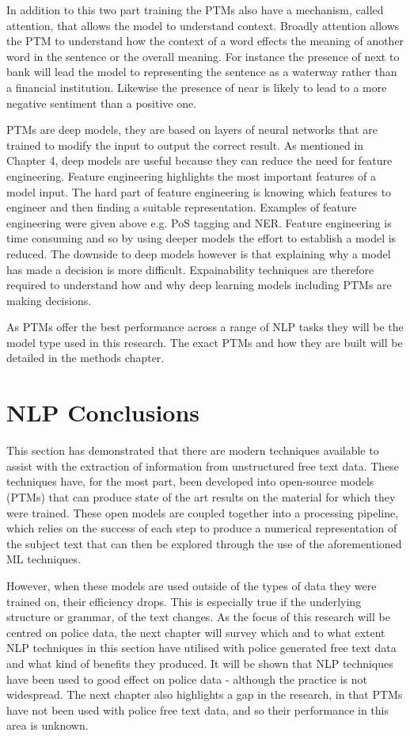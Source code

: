 In addition to this two part training the PTMs also have a mechanism, called attention, that allows the model to understand context. Broadly attention allows the PTM to understand how the context of a word effects the meaning of another word in the sentence or the overall meaning. For instance the presence of  next to {bank} will lead the model to representing the sentence as a waterway rather than a financial institution. Likewise the presence of  near  is likely to lead to a more negative sentiment than a positive one.

PTMs are deep models, they are based on layers of neural networks that are trained to modify the input to output the correct result. As mentioned in Chapter 4, deep models are useful because they can reduce the need for feature engineering. Feature engineering highlights the most important features of a model input. The hard part of feature engineering is knowing which features to engineer and then finding a suitable representation. Examples of feature engineering were given above e.g. PoS tagging and NER.   Feature engineering is time consuming and so by using deeper models the effort to establish a model is reduced. The downside to deep models however is that explaining why a model has made a decision is more difficult. Expainability techniques are therefore required to understand how and why deep learning models including PTMs are making decisions.

As PTMs offer the best performance across a range of NLP tasks they will be the model type used in this research. The exact PTMs and how they are built will be detailed in the methods chapter. 

\section{ NLP Conclusions} This section has demonstrated that there are modern techniques available to assist with the extraction of information from unstructured free text data. These techniques have, for the most part, been developed into open-source models (PTMs) that can produce state of the art results on the material for which they were trained. These open models are coupled together into a processing pipeline, which relies on the success of each step to produce a numerical representation of the subject text that can then be explored through the use of the aforementioned ML techniques.

However, when these models are used outside of the types of data they were trained on, their efficiency drops. This is especially true if the underlying structure or grammar, of the text changes. As the focus of this research will be centred on police data, the next chapter will survey which and to what extent NLP techniques in this section have utilised with police generated free text data and what kind of benefits they produced. It will be shown that NLP techniques have been used to good effect on police data - although the practice is not widespread. The next chapter also highlights a gap in the research, in that PTMs have not been used with police free text data, and so their performance in this area is unknown.

